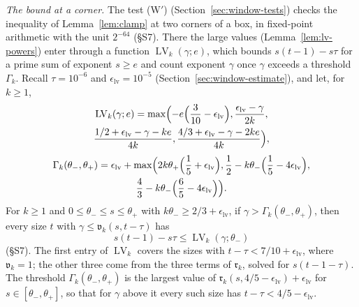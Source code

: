 \documentclass[11pt]{article}
\theoremstyle{definition}
\begin{document}
\emph{The bound at a corner.} The test (W$'$) (Section~\ref{sec:window-tests}) checks the inequality of
Lemma~\ref{lem:clamp} at two corners of a box, in fixed-point arithmetic with the unit $2^{-64}$ (\S S7). There the
large values (Lemma~\ref{lem:lv-powers}) enter through a function $\operatorname{LV}_k(\gamma; e)$, which bounds $s(t -
1) - s\tau$ for a prime sum of exponent $s \ge e$ and count exponent $\gamma$ once $\gamma$ exceeds a threshold
$\Gamma_k$. Recall $\tau = 10^{-6}$ and $\epsilon_{\mathrm{lv}} = 10^{-5}$ (Section~\ref{sec:window-estimate}), and
let, for $k \ge 1$,
\begin{multline*}
  \operatorname{LV}_k(\gamma; e) = \max\Bigl(-e\Bigl(\frac3{10} - \epsilon_{\mathrm{lv}}\Bigr),
  \frac{\epsilon_{\mathrm{lv}} - \gamma}{2k}, \\
  \frac{1/2 + \epsilon_{\mathrm{lv}} - \gamma - ke}{4k}, \frac{4/3 + \epsilon_{\mathrm{lv}} - \gamma - 2ke}{4k}\Bigr),
\end{multline*}
\begin{multline*}
  \Gamma_k(\theta_-, \theta_+) = \epsilon_{\mathrm{lv}} + \max\Bigl(2k\theta_+\Bigl(\frac15 +
  \epsilon_{\mathrm{lv}}\Bigr),
  \frac12 - k\theta_-\Bigl(\frac15 - 4\epsilon_{\mathrm{lv}}\Bigr), \\
  \frac43 - k\theta_-\Bigl(\frac65 - 4\epsilon_{\mathrm{lv}}\Bigr)\Bigr).
\end{multline*}
For $k \ge 1$ and $0 \le \theta_- \le s \le \theta_+$ with $k\theta_- \ge 2/3 + \epsilon_{\mathrm{lv}}$, if $\gamma >
\Gamma_k(\theta_-, \theta_+)$, then every size $t$ with $\gamma \le \mathfrak v_k(s, t - \tau)$ has
\[
  s(t - 1) - s\tau \le \operatorname{LV}_k(\gamma; \theta_-) \tag{LV}
\]
(\S S7). The first entry of $\operatorname{LV}_k$ covers the sizes with $t - \tau < 7/10 + \epsilon_{\mathrm{lv}}$,
where $\mathfrak v_k = 1$; the other three come from the three terms of $\mathfrak r_k$, solved for $s(t - 1 - \tau)$.
The threshold $\Gamma_k(\theta_-, \theta_+)$ is the largest value of $\mathfrak r_k(s, 4/5 - \epsilon_{\mathrm{lv}}) +
\epsilon_{\mathrm{lv}}$ for $s \in [\theta_-, \theta_+]$, so that for $\gamma$ above it every such size has $t - \tau <
4/5 - \epsilon_{\mathrm{lv}}$.
\end{document}
